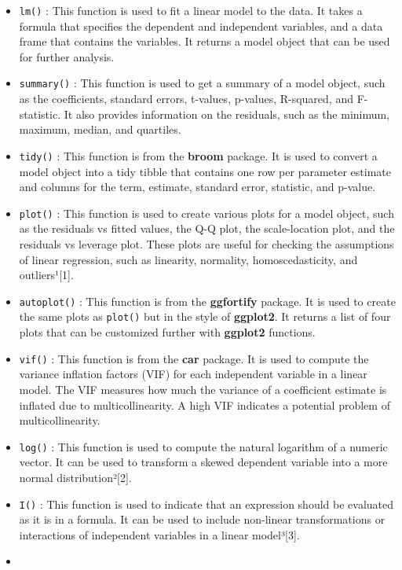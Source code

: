 \documentclass[
]{book}
\providecommand{\tightlist}{%
  \setlength{\itemsep}{0pt}\setlength{\parskip}{0pt}}
\begin{document}
\begin{itemize}
\tightlist
\item
  \texttt{lm()} : This function is used to fit a linear model to the data. It takes a formula that specifies the dependent and independent variables, and a data frame that contains the variables. It returns a model object that can be used for further analysis.
\item
  \texttt{summary()} : This function is used to get a summary of a model object, such as the coefficients, standard errors, t-values, p-values, R-squared, and F-statistic. It also provides information on the residuals, such as the minimum, maximum, median, and quartiles.
\item
  \texttt{tidy()} : This function is from the \textbf{broom} package. It is used to convert a model object into a tidy tibble that contains one row per parameter estimate and columns for the term, estimate, standard error, statistic, and p-value.
\item
  \texttt{plot()} : This function is used to create various plots for a model object, such as the residuals vs fitted values, the Q-Q plot, the scale-location plot, and the residuals vs leverage plot. These plots are useful for checking the assumptions of linear regression, such as linearity, normality, homoscedasticity, and outliers¹{[}1{]}.
\item
  \texttt{autoplot()} : This function is from the \textbf{ggfortify} package. It is used to create the same plots as \texttt{plot()} but in the style of \textbf{ggplot2}. It returns a list of four plots that can be customized further with \textbf{ggplot2} functions.
\item
  \texttt{vif()} : This function is from the \textbf{car} package. It is used to compute the variance inflation factors (VIF) for each independent variable in a linear model. The VIF measures how much the variance of a coefficient estimate is inflated due to multicollinearity. A high VIF indicates a potential problem of multicollinearity.
\item
  \texttt{log()} : This function is used to compute the natural logarithm of a numeric vector. It can be used to transform a skewed dependent variable into a more normal distribution²{[}2{]}.
\item
  \texttt{I()} : This function is used to indicate that an expression should be evaluated as it is in a formula. It can be used to include non-linear transformations or interactions of independent variables in a linear model³{[}3{]}.
\item

\end{itemize}
\end{document}
